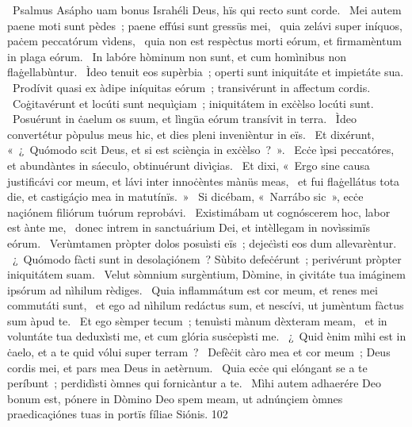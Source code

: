 {~Psalmus Asápho}
{%
uam bonus Israhéli Deus, hïs qui recto sunt corde. 
~Mei autem paene moti sunt pèdes~; paene effúsi sunt gressüs mei, 
~quia zelávi super iníquos, paċem peccatórum vìdens, 
~quia non est respèctus morti eórum, et firmamèntum in plaga eórum. 
~In labóre hòminum non sunt, et cum homìnibus non flaġellabùntur. 
~Ìdeo tenuit eos supèrbia~; operti sunt iniquitáte et impietáte sua. 
~Prodívit quasi ex àdipe iníquitas eórum~; transivérunt in affectum cordis. 
~Coġitavérunt et locúti sunt nequìçiam~; iniquitátem in exċèlso locúti sunt. 
~Posuérunt in ċaelum os suum, et lìngüa eórum transívit in terra. 
~Ìdeo convertétur pòpulus meus hic, et dies pleni invenièntur in eïs. 
~Et dixérunt, «~¿~Quómodo scit Deus, et si est sciènçia in exċèlso~?~». 
~Ecċe ìpsi peccatóres, et abundàntes in sáeculo, obtinuérunt divìçias. 
~Et dixi, «~Ergo sine causa justificávi cor meum, et lávi inter innoċèntes mànüs meas, 
~et fui flaġellátus tota die, et castigáçio mea in matutínïs.~»
~Si dicébam, «~Narrábo sic~», ecċe naçiónem filiórum tuórum reprobávi. 
~Existimábam ut cognóscerem hoc, labor est ànte me, 
~donec intrem in sanctuárium Dei, et intèllegam in novìssimïs eórum. 
~Verùmtamen pròpter dolos posuìsti eïs~; dejeċìsti eos dum allevarèntur. 
~¿~Quómodo fàcti sunt in desolaçiónem~? Sùbito defeċérunt~; perivérunt pròpter iniquitátem suam. 
~Velut sòmnium surgèntium, Dòmine, in çivitáte tua imáginem ipsórum ad nìhilum rèdiges. 
~Quia inflammátum est cor meum, et renes mei commutáti sunt, 
~et ego ad nìhilum redáctus sum, et nescívi, ut jumèntum fàctus sum àpud te. 
~Et ego sèmper tecum~; tenuìsti mànum dèxteram meam, 
~et in voluntáte tua deduxìsti me, et cum glória susċepìsti me. 
~¿~Quid ènim mìhi est in ċaelo, et a te quid vólui super terram~? 
~Defèċit càro mea et cor meum~; Deus cordis mei, et pars mea Deus in aetèrnum. 
~Quia ecċe qui elóngant se a te períbunt~; perdidìsti òmnes qui fornicàntur a te. 
~Mìhi autem adhaerére Deo bonum est, pónere in Dòmino Deo spem meam, ut adnúnçiem òmnes praedicaçiónes tuas in portïs fíliae Siónis. 
}
{10}{2}
